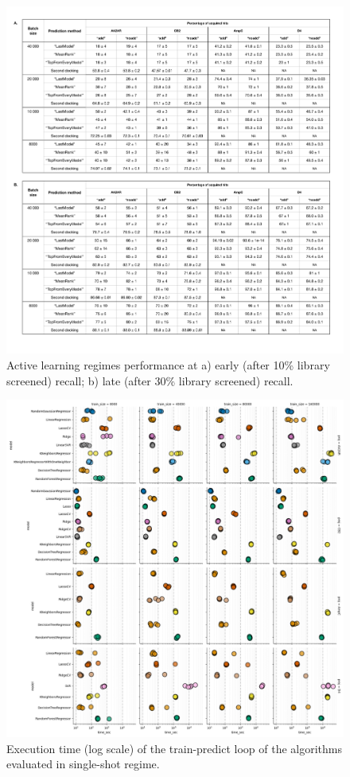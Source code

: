 \begin{figure}[ht]
\centering
\includegraphics[width=1.0\textwidth]{tables/table_1_full.pdf}
\caption{Active learning regimes performance at a) early (after 10\% library screened) recall; b) late (after 30\% library screened) recall.}
\label{tab:tab_1_activelearning}
\end{figure}



\begin{figure}[ht]
\centering
\includegraphics[width=1.0\textwidth]{figures/Supp_Figure_1_execution_time.png}
\caption{Execution time (log scale) of the train-predict loop of the algorithms evaluated in single-shot regime.}
\label{fig:supp_fig_1_execution_time}
\end{figure}
